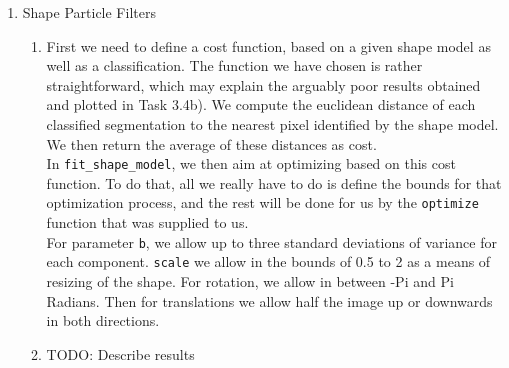 \documentclass[
    a4paper,
    12pt,
    parskip=half,
]{scrarticle}
\begin{document}
\begin{enumerate}
\begin{enumerate}[label=\theenumi.\arabic*.]
\begin{enumerate}[label=\alph*)]
        \end{enumerate}
        \item Shape Particle Filters
        \begin{enumerate}[label=\alph*)]
            \item First we need to define a cost function, based on a given shape model as well as a classification. The function we have chosen is rather straightforward, which may explain the arguably poor results obtained and plotted in Task 3.4b). We compute the euclidean distance of each classified segmentation to the nearest pixel identified by the shape model. We then return the average of these distances as cost.\\
            In \texttt{fit\_shape\_model}, we then aim at optimizing based on this cost function. To do that, all we really have to do is define the bounds for that optimization process, and the rest will be done for us by the \texttt{optimize} function that was supplied to us.\\
            For parameter \texttt{b}, we allow up to three standard deviations of variance for each component. \texttt{scale} we allow in the bounds of 0.5 to 2 as a means of resizing of the shape.  For rotation, we allow in between -Pi and Pi Radians. Then for translations we allow half the image up or downwards in both directions.
            \item TODO: Describe results
        \end{enumerate}
    \end{enumerate}
\end{enumerate}
\end{document}
